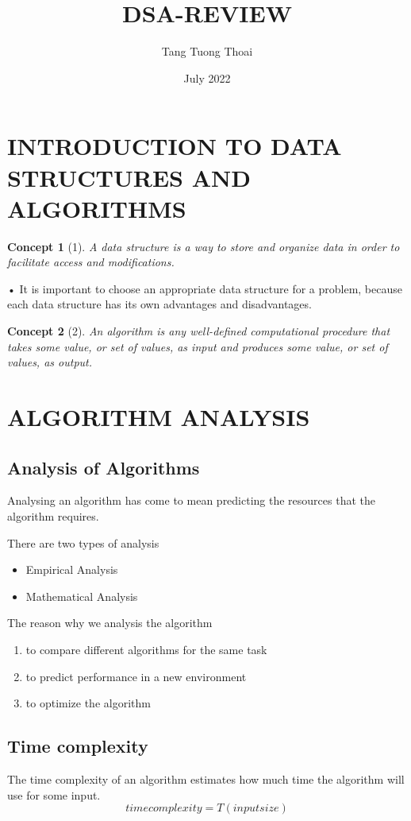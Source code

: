 \documentclass{article}
\title{DSA-REVIEW}
\author{Tang Tuong Thoai }
\date{July 2022}
\newtheorem*{concept}{Concept}
\begin{document}
\maketitle

\section{INTRODUCTION TO DATA STRUCTURES AND ALGORITHMS}
\begin{concept}[1]
    A data structure is a way to store and organize data in order to facilitate access and modifications.
\end{concept}



• It is important to choose an appropriate data structure for a problem,
because each data structure has its own advantages and disadvantages.

\begin{concept}[2]
   An algorithm is any well-defined computational procedure that takes some value, or set of values, as input and produces some value, or set of values, as output.
\end{concept}



\section{ALGORITHM ANALYSIS}
\subsection{Analysis of Algorithms} 
Analysing an algorithm has come to mean predicting the resources that the algorithm requires.

There are two types of analysis
\begin{itemize}
    \item Empirical Analysis
    \item Mathematical Analysis
\end{itemize}

The reason why we analysis the algorithm
\begin{enumerate}
    \item to compare different algorithms for the same task
    \item to predict performance in a new environment
    \item to optimize the algorithm
\end{enumerate}

\subsection{Time complexity}
The time complexity of an algorithm estimates how much time the algorithm will use for some input. 
\begin{equation}
    time complexity = T(input size) 
\end{equation}    
    
\end{document}
